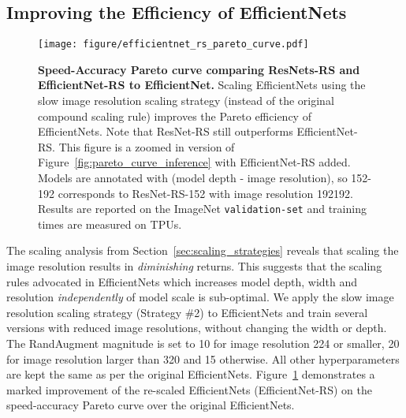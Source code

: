 \documentclass{article}
\begin{document}
\subsection{Improving the Efficiency of EfficientNets \label{sec:efficientnet_case_study}}
\begin{figure}[t!]
    \begin{center}
    \texttt{[image: figure/efficientnet\_rs\_pareto\_curve.pdf]}
    \end{center}
    \vspace{-0.4cm}
    \caption{\textbf{Speed-Accuracy Pareto curve comparing ResNets-RS and EfficientNet-RS to EfficientNet.} Scaling EfficientNets using the slow image resolution scaling strategy (instead of the original compound scaling rule) improves the Pareto efficiency of EfficientNets. Note that ResNet-RS still outperforms EfficientNet-RS. This figure is a zoomed in version of Figure~\ref{fig:pareto_curve_inference} with EfficientNet-RS added. 
    Models are annotated with (model depth - image resolution), so 152-192 corresponds to ResNet-RS-152 with image resolution 192192. 
    Results are reported on the ImageNet \texttt{validation-set} and training times are measured on TPUs.}
    \label{fig:enet_rs_pareto_curve_inference}
    \vspace{-0.1cm}
\end{figure}

The scaling analysis from Section~\ref{sec:scaling_strategies} reveals that scaling the image resolution results in \emph{diminishing} returns. 
This suggests that the scaling rules advocated in EfficientNets which increases model depth, width and resolution \emph{independently} of model scale is sub-optimal. 
We apply the slow image resolution scaling strategy (Strategy \#2) to EfficientNets and train several versions with reduced image resolutions, without changing the width or depth. 
The RandAugment magnitude is set to 10 for image resolution 224 or smaller, 20 for image resolution larger than 320 and 15 otherwise.
All other hyperparameters are kept the same as per the original EfficientNets.
Figure~\ref{fig:enet_rs_pareto_curve_inference} demonstrates a marked improvement of the re-scaled EfficientNets (EfficientNet-RS) on the speed-accuracy Pareto curve over the original EfficientNets.
\end{document}
